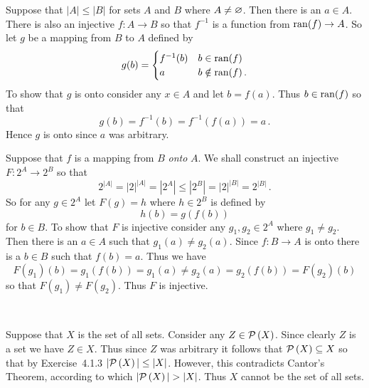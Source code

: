 
\begin{solution}
	Suppose that $|A| \leq |B|$ for sets $A$ and $B$ where $A \neq \varnothing$.
    Then there is an $a \in A$.
    There is also an injective $f : A \to B$ so that $f^{-1}$ is a function from $\mathrm{ran}(f) \to A$.
    So let $g$ be a mapping from $B$ to $A$ defined by
    $$
    g(b) = \begin{cases}
    	f^{-1}(b) & b \in \mathrm{ran}(f) \\
        a & b \notin \mathrm{ran}(f) \,.
    \end{cases}
    $$
    To show that $g$ is onto consider any $x \in A$ and let $b = f(a)$. Thus $b \in \mathrm{ran}(f)$ so that
    $$
    g(b) = f^{-1}(b) = f^{-1}(f(a)) = a \,.
    $$
    Hence $g$ is onto since $a$ was arbitrary. \qedsymbol
\end{solution}


\begin{solution}
	Suppose that $f$ is a mapping from $B$ \emph{onto} $A$.
    We shall construct an injective $F: 2^A \to 2^B$ so that
    $$
    2^{|A|} = |2|^{|A|} = |2^A| \leq |2^B| = |2|^{|B|} = 2^{|B|} \,.
    $$
    So for any $g \in 2^A$ let $F(g) = h$ where $h \in 2^B$ is defined by
    $$
    h(b) = g(f(b))
    $$
    for $b \in B$.
    To show that $F$ is injective consider any $g_1, g_2 \in 2^A$ where $g_1 \neq g_2$.
    Then there is an $a \in A$ such that $g_1(a) \neq g_2(a)$.
    Since $f : B \to A$ is onto there is a $b \in B$ such that $f(b) = a$.
    Thus we have
    $$
    F(g_1)(b) = g_1(f(b)) = g_1(a) \neq g_2(a) = g_2(f(b)) = F(g_2)(b)
    $$
    so that $F(g_1) \neq F(g_2)$.
    Thus $F$ is injective. \qedsymbol
\end{solution}\


\begin{solution}
	Suppose that $X$ is the set of all sets.
    Consider any $Z \in \mathcal{P}\left(X\right)$.
    Since clearly $Z$ is a set we have $Z \in X$.
    Thus since $Z$ was arbitrary it follows that $\mathcal{P}\left(X\right) \subseteq X$ so that by Exercise~4.1.3 $|\mathcal{P}\left(X\right)| \leq |X|$.
    However, this contradicts Cantor's Theorem, according to which $|\mathcal{P}\left(X\right)| > |X|$.
    Thus $X$ cannot be the set of all sets. \qedsymbol
\end{solution}


